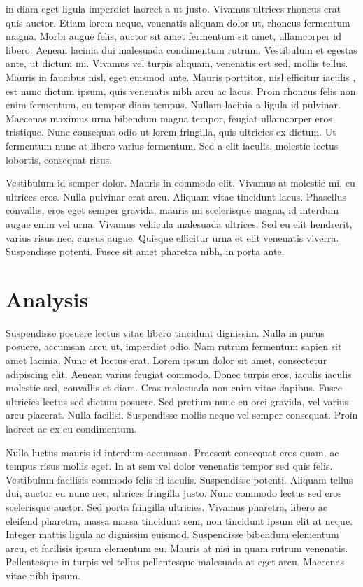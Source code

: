 \documentclass[11pt,a4paper]{article}
\begin{document}
\citep{E2011} in diam eget ligula imperdiet laoreet a ut justo. Vivamus ultrices rhoncus erat quis auctor. Etiam lorem neque, venenatis aliquam dolor ut, rhoncus fermentum magna. Morbi augue felis, auctor sit amet fermentum sit amet, ullamcorper id libero. Aenean lacinia dui malesuada condimentum rutrum. Vestibulum et egestas ante, ut dictum mi. Vivamus vel turpis aliquam, venenatis est sed, mollis tellus. Mauris in faucibus nisl, eget euismod ante. Mauris porttitor, nisl efficitur iaculis \cite{BBD2013}, est nunc dictum ipsum, quis venenatis nibh arcu ac lacus. Proin rhoncus felis non enim fermentum, eu tempor diam tempus. Nullam lacinia a ligula id pulvinar. Maecenas maximus urna bibendum magna tempor, feugiat ullamcorper eros tristique. Nunc consequat odio ut lorem fringilla, quis ultricies ex dictum. Ut fermentum nunc at libero varius fermentum. Sed a elit iaculis, molestie lectus lobortis, consequat risus.

Vestibulum id semper dolor. Mauris in commodo elit. Vivamus at molestie mi, eu ultrices eros. Nulla pulvinar erat arcu. Aliquam vitae tincidunt lacus. Phasellus convallis, eros eget semper gravida, mauris mi scelerisque magna, id interdum augue enim vel urna. Vivamus vehicula malesuada ultrices. Sed eu elit hendrerit, varius risus nec, cursus augue. Quisque efficitur urna et elit venenatis viverra. Suspendisse potenti. Fusce sit amet pharetra nibh, in porta ante.


\section{Analysis}
Suspendisse posuere lectus vitae libero tincidunt dignissim. Nulla in purus posuere, accumsan arcu ut, imperdiet odio. Nam rutrum fermentum sapien sit amet lacinia. Nunc et luctus erat. Lorem ipsum dolor sit amet, consectetur adipiscing elit. Aenean varius feugiat commodo. Donec turpis eros, iaculis iaculis molestie sed, convallis et diam. Cras malesuada non enim vitae dapibus. Fusce ultricies lectus sed dictum posuere. Sed pretium nunc eu orci gravida, vel varius arcu placerat. Nulla facilisi. Suspendisse mollis neque vel semper consequat. Proin laoreet ac ex eu condimentum.

Nulla luctus mauris id interdum accumsan. Praesent consequat eros quam, ac tempus risus mollis eget. In at sem vel dolor venenatis tempor sed quis felis. Vestibulum facilisis commodo felis id iaculis. Suspendisse potenti. Aliquam tellus dui, auctor eu nunc nec, ultrices fringilla justo. Nunc commodo lectus sed eros scelerisque auctor. Sed porta fringilla ultricies. Vivamus pharetra, libero ac eleifend pharetra, massa massa tincidunt sem, non tincidunt ipsum elit at neque. Integer mattis ligula ac dignissim euismod. Suspendisse bibendum elementum arcu, et facilisis ipsum elementum eu. Mauris at nisi in quam rutrum venenatis. Pellentesque in turpis vel tellus pellentesque malesuada at eget arcu. Maecenas vitae nibh ipsum.
\end{document}
